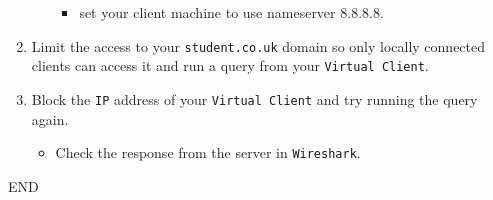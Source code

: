 \documentclass[11pt]{article}
\begin{document}
\begin{enumerate}
\begin{itemize}
\begin{itemize}
                    \item set your client machine to use nameserver 8.8.8.8.
                \end{itemize}
            \end{itemize}
    \item Limit the access to your \texttt{student.co.uk} domain so only locally connected clients can access it and run a query from your \texttt{Virtual Client}. 
    \item Block the \texttt{IP} address of your \texttt{Virtual Client} and try running the query again.
        \begin{itemize}
            \item Check the response from the server in \texttt{Wireshark}.
        \end{itemize}
\end{enumerate}    
END
\end{document}

